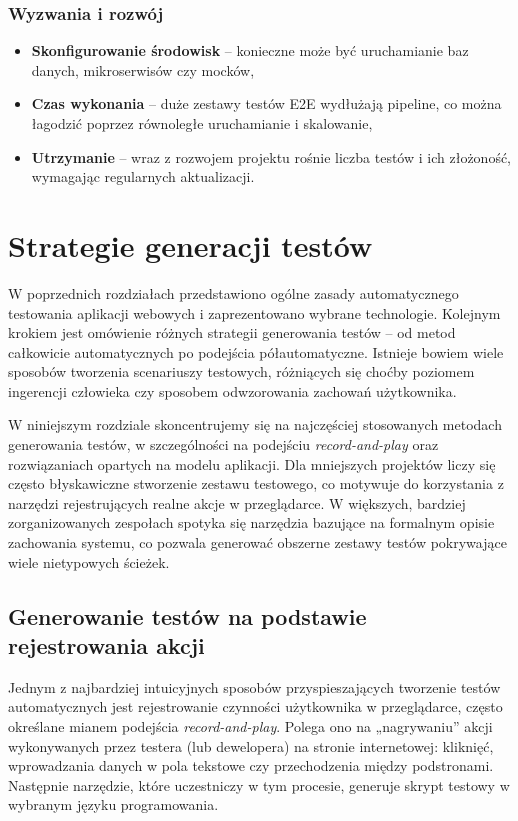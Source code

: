 \documentclass[12pt]{report}
\begin{document}
\subsection*{Wyzwania i rozwój}
\begin{itemize}
    \item \textbf{Skonfigurowanie środowisk} -- konieczne może być uruchamianie baz danych, mikroserwisów czy mocków,
    \item \textbf{Czas wykonania} -- duże zestawy testów E2E wydłużają pipeline, co można łagodzić poprzez równoległe uruchamianie i skalowanie,
    \item \textbf{Utrzymanie} -- wraz z rozwojem projektu rośnie liczba testów i ich złożoność, wymagając regularnych aktualizacji.
\end{itemize}

\chapter{Strategie generacji testów}
\label{chap:strategie-generacji}
W poprzednich rozdziałach przedstawiono ogólne zasady automatycznego testowania aplikacji webowych i zaprezentowano wybrane technologie. Kolejnym krokiem jest omówienie różnych strategii generowania testów -- od metod całkowicie automatycznych po podejścia półautomatyczne. Istnieje bowiem wiele sposobów tworzenia scenariuszy testowych, różniących się choćby poziomem ingerencji człowieka czy sposobem odwzorowania zachowań użytkownika.

W niniejszym rozdziale skoncentrujemy się na najczęściej stosowanych metodach generowania testów, w szczególności na podejściu \emph{record-and-play} oraz rozwiązaniach opartych na modelu aplikacji. Dla mniejszych projektów liczy się często błyskawiczne stworzenie zestawu testowego, co motywuje do korzystania z narzędzi rejestrujących realne akcje w przeglądarce. W większych, bardziej zorganizowanych zespołach spotyka się narzędzia bazujące na formalnym opisie zachowania systemu, co pozwala generować obszerne zestawy testów pokrywające wiele nietypowych ścieżek.

\section{Generowanie testów na podstawie rejestrowania akcji}
\label{sec:generowanie-rejestrowanie}

Jednym z najbardziej intuicyjnych sposobów przyspieszających tworzenie testów automatycznych jest rejestrowanie czynności użytkownika w przeglądarce, często określane mianem podejścia \emph{record-and-play}. Polega ono na „nagrywaniu” akcji wykonywanych przez testera (lub dewelopera) na stronie internetowej: kliknięć, wprowadzania danych w pola tekstowe czy przechodzenia między podstronami. Następnie narzędzie, które uczestniczy w tym procesie, generuje skrypt testowy w wybranym języku programowania.
\end{document}
